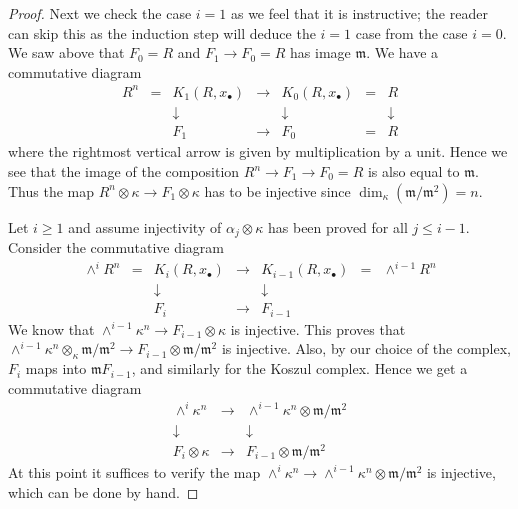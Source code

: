 \begin{proof}
\medskip\noindent
Next we check the case $i = 1$ as we feel that it is instructive;
the reader can skip this as the induction step will deduce the $i = 1$
case from the case $i = 0$. We saw above that
$F_0 = R$ and $F_1 \to F_0 = R$ has image $\mathfrak m$.
We have a commutative diagram
$$
\begin{matrix}
R^n & = & K_1(R, x_{\bullet}) & \to & K_0(R, x_{\bullet}) & = & R \\
& & \downarrow & & \downarrow & & \downarrow \\
& & F_1 & \to & F_0 & = & R
\end{matrix}
$$
where the rightmost vertical arrow is given by multiplication
by a unit. Hence we see that the image of the composition
$R^n \to F_1 \to F_0 = R$ is also equal to $\mathfrak m$.
Thus the map $R^n \otimes \kappa \to F_1 \otimes \kappa$
has to be injective since $\dim_\kappa (\mathfrak m / \mathfrak m^2) = n$.

\medskip\noindent
Let $i \geq 1$ and assume injectivity of $\alpha_j \otimes \kappa$ has been
proved for all $j \leq i - 1$. Consider the commutative diagram
$$
\begin{matrix}
\wedge^i R^n & = & K_i(R, x_{\bullet}) & \to & K_{i-1}(R, x_{\bullet})
& = & \wedge^{i-1} R^n \\
& & \downarrow & & \downarrow & & \\
& & F_i & \to & F_{i-1} & &
\end{matrix}
$$
We know that $\wedge^{i-1} \kappa^n \to F_{i-1} \otimes \kappa$
is injective. This proves that
$\wedge^{i-1} \kappa^n \otimes_{\kappa} \mathfrak m/\mathfrak m^2
\to F_{i-1} \otimes \mathfrak m/\mathfrak m^2$ is injective.
Also, by our choice of the complex, $F_i$ maps into
$\mathfrak mF_{i-1}$, and similarly for the Koszul complex.
Hence we get a commutative diagram
$$
\begin{matrix}
\wedge^i \kappa^n & \to &
\wedge^{i-1} \kappa^n \otimes \mathfrak m/\mathfrak m^2 \\
\downarrow & & \downarrow \\
F_i \otimes \kappa & \to & F_{i-1} \otimes \mathfrak m/\mathfrak m^2
\end{matrix}
$$
At this point it suffices to verify the map
$\wedge^i \kappa^n \to
\wedge^{i-1} \kappa^n \otimes \mathfrak m/\mathfrak m^2$
is injective, which can be done by hand.
\end{proof}
